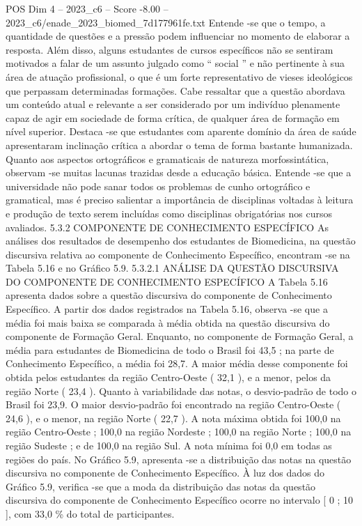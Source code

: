 \begin{textsample}{POS Dim 4 – 2023\_c6 – Score -8.00 – 2023\_c6/enade\_2023\_biomed\_7d177961fe.txt}
Entende -se que o tempo, a quantidade de questões e a pressão podem influenciar no momento de elaborar a resposta.
Além disso, alguns estudantes de cursos específicos não se sentiram motivados a falar de um assunto julgado como “ social ” e não pertinente à sua área de atuação profissional, o que é um forte representativo de vieses ideológicos que perpassam determinadas formações.
Cabe ressaltar que a questão abordava um conteúdo atual e relevante a ser considerado por um indivíduo plenamente capaz de agir em sociedade de forma crítica, de qualquer área de formação em nível superior.
Destaca -se que estudantes com aparente domínio da área de saúde apresentaram inclinação crítica a abordar o tema de forma bastante humanizada.
Quanto aos aspectos ortográficos e gramaticais de natureza morfossintática, observam -se muitas lacunas trazidas desde a educação básica.
Entende -se que a universidade não pode sanar todos os problemas de cunho ortográfico e gramatical, mas é preciso salientar a importância de disciplinas voltadas à leitura e produção de texto serem incluídas como disciplinas obrigatórias nos cursos avaliados. 5.3.2 COMPONENTE DE CONHECIMENTO ESPECÍFICO As análises dos resultados de desempenho dos estudantes de Biomedicina, na questão discursiva relativa ao componente de Conhecimento Específico, encontram -se na Tabela 5.16 e no Gráfico 5.9. 5.3.2.1 ANÁLISE DA QUESTÃO DISCURSIVA DO COMPONENTE DE CONHECIMENTO ESPECÍFICO A Tabela 5.16 apresenta dados sobre a questão discursiva do componente de Conhecimento Específico.
A partir dos dados registrados na Tabela 5.16, observa -se que a média foi mais baixa se comparada à média obtida na questão discursiva do componente de Formação Geral.
Enquanto, no componente de Formação Geral, a média para estudantes de Biomedicina de todo o Brasil foi 43,5 ; na parte de Conhecimento Específico, a média foi 28,7.
A maior média desse componente foi obtida pelos estudantes da região Centro-Oeste ( 32,1 ), e a menor, pelos da região Norte ( 23,4 ).
Quanto à variabilidade das notas, o desvio-padrão de todo o Brasil foi 23,9.
O maior desvio-padrão foi encontrado na região Centro-Oeste ( 24,6 ), e o menor, na região Norte ( 22,7 ).
A nota máxima obtida foi 100,0 na região Centro-Oeste ; 100,0 na região Nordeste ; 100,0 na região Norte ; 100,0 na região Sudeste ; e de 100,0 na região Sul.
A nota mínima foi 0,0 em todas as regiões do país.
No Gráfico 5.9, apresenta -se a distribuição das notas na questão discursiva no componente de Conhecimento Específico.
À luz dos dados do Gráfico 5.9, verifica -se que a moda da distribuição das notas da questão discursiva do componente de Conhecimento Específico ocorre no intervalo [ 0 ; 10 ], com 33,0 \% do total de participantes.

\end{textsample}
